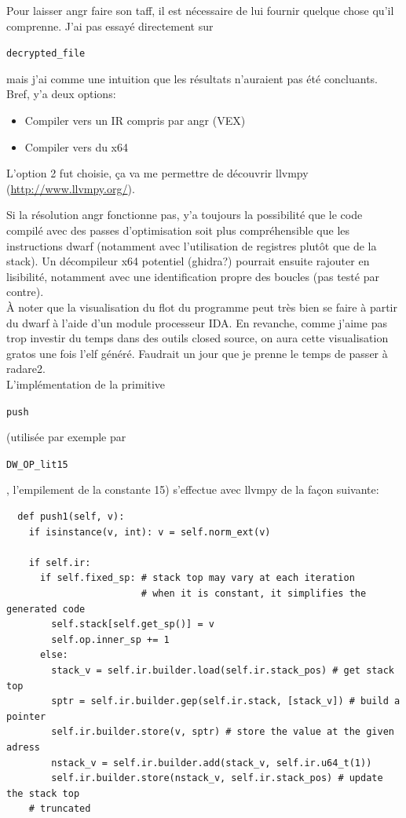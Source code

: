 \documentclass[14pt]{article}
\newcommand{\inlinebox}[2]{%
\colorbox{bg}{%
\parbox[b][0.6em]{\widthof{\texttt{#2}}}{\texttt{#2}}
}
}
\newcommand{\inlinec}[1]{ \inlinebox{c}{#1} }
\newcommand{\filename}[1]{ \inlinebox{bash}{#1} }
\theoremstyle{definition}
\begin{document}
Pour laisser angr faire son taff, il est nécessaire de lui fournir quelque chose qu'il comprenne.
J'ai pas essayé directement sur \filename{decrypted_file} mais j'ai comme une intuition que les résultats n'auraient pas été concluants.
Bref, y'a deux options:
\begin{itemize}
  \item Compiler vers un IR compris par angr (VEX)
  \item Compiler vers du x64
\end{itemize}
L'option 2 fut choisie, ça va me permettre de découvrir llvmpy (\url{http://www.llvmpy.org/}).


Si la résolution angr fonctionne pas, y'a toujours la possibilité que le code compilé avec des passes d'optimisation soit plus compréhensible que les instructions dwarf (notamment avec l'utilisation de registres plutôt que de la stack).
Un décompileur x64 potentiel (ghidra?) pourrait ensuite rajouter en lisibilité, notamment avec une identification propre des boucles (pas testé par contre).\\ 


À noter que la visualisation du flot du programme peut très bien se faire à partir du dwarf à l'aide d'un module processeur IDA. 
En revanche, comme j'aime pas trop investir du temps dans des outils closed source, on aura cette visualisation gratos une fois l'elf généré. Faudrait un jour que je prenne le temps de passer à radare2. \\ 


L'implémentation de la primitive \inlinec{push} (utilisée par exemple par \inlinec{DW_OP_lit15}, l'empilement de la constante 15) s'effectue avec llvmpy de la façon suivante:

\begin{verbatim}
  def push1(self, v):
    if isinstance(v, int): v = self.norm_ext(v)

    if self.ir:
      if self.fixed_sp: # stack top may vary at each iteration
                        # when it is constant, it simplifies the generated code
        self.stack[self.get_sp()] = v
        self.op.inner_sp += 1
      else:
        stack_v = self.ir.builder.load(self.ir.stack_pos) # get stack top
        sptr = self.ir.builder.gep(self.ir.stack, [stack_v]) # build a pointer
        self.ir.builder.store(v, sptr) # store the value at the given adress
        nstack_v = self.ir.builder.add(stack_v, self.ir.u64_t(1))
        self.ir.builder.store(nstack_v, self.ir.stack_pos) # update the stack top
    # truncated
\end{verbatim}
\end{document}
